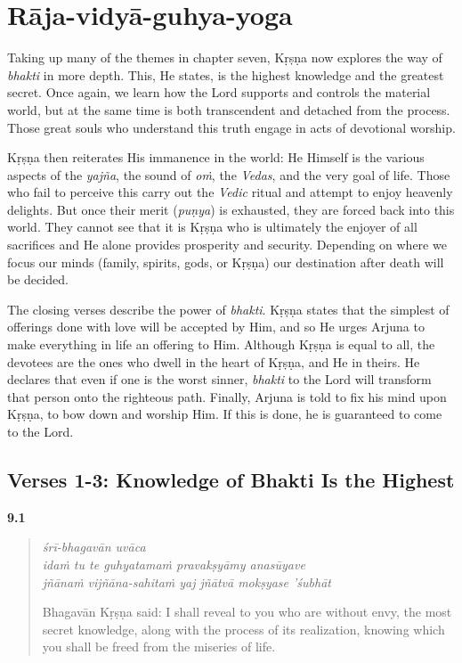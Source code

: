 \chapter{Rāja-vidyā-guhya-yoga}\label{chap-raja-vidya-guhya-yoga}



\noindent Taking up many of the themes in chapter seven, Kṛṣṇa now explores the way of \textit{bhakti} in more depth. This, He states, is the highest knowledge and the greatest secret. Once again, we learn how the Lord supports and controls the material world, but at the same time is both transcendent and detached from the process. Those great souls who understand this truth engage in acts of devotional worship.

Kṛṣṇa then reiterates His immanence in the world: He Himself is the various aspects of the \textit{yajña}, the sound of \textit{oṁ}, the \textit{Vedas}, and the very goal of life. Those who fail to perceive this carry out the \textit{Vedic} ritual and attempt to enjoy heavenly delights. But once their merit (\textit{puṇya}) is exhausted, they are forced back into this world. They cannot see that it is Kṛṣṇa who is ultimately the enjoyer of all sacrifices and He alone provides prosperity and security. Depending on where we focus our minds (family, spirits, gods, or Kṛṣṇa) our destination after death will be decided.

The closing verses describe the power of \textit{bhakti}. Kṛṣṇa states that the simplest of offerings done with love will be accepted by Him, and so He urges Arjuna to make everything in life an offering to Him. Although Kṛṣṇa is equal to all, the devotees are the ones who dwell in the heart of Kṛṣṇa, and He in theirs. He declares that even if one is the worst sinner, \textit{bhakti} to the Lord will transform that person onto the righteous path. Finally, Arjuna is told to fix his mind upon Kṛṣṇa, to bow down and worship Him. If this is done, he is guaranteed to come to the Lord.

\section{Verses 1-3: Knowledge of Bhakti Is the Highest}\label{sec-verses-1-3-knowledge-of-bhakti-is-the-highest}


\par\noindent\textbf{9.1}\par
\begin{verse}
\textit{śrī-bhagavān uvāca} \\
\textit{idaṁ tu te guhyatamaṁ pravakṣyāmy anasūyave} \\
\textit{jñānaṁ vijñāna-sahitaṁ yaj jñātvā mokṣyase ’śubhāt}

\noindent Bhagavān Kṛṣṇa said: I shall reveal to you who are without envy, the most secret knowledge, along with the process of its realization, knowing which you shall be freed from the miseries of life.
\end{verse}
\par



